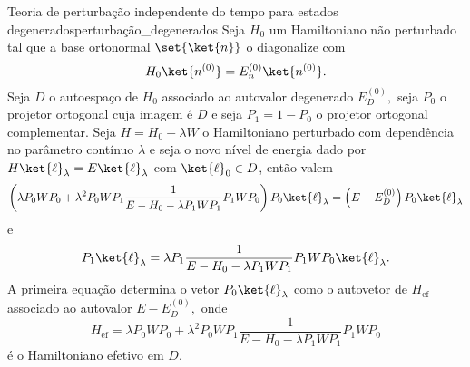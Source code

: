 \begin{theorem}{Teoria de perturbação independente do tempo para estados degenerados}{perturbação_degenerados}
    Seja \(H_0\) um Hamiltoniano não perturbado tal que a base ortonormal \(\set{\ket{n}}\) o diagonalize com 
    \begin{equation*}
        H_0 \ket{n^{(0)}} = E_{n}^{(0)} \ket{n^{(0)}}.
    \end{equation*}
    Seja \(D\) o autoespaço de \(H_0\) associado ao autovalor degenerado \(E_D^{(0)},\) seja \(P_0\) o projetor ortogonal cuja imagem é \(D\) e seja \(P_1 = 1 - P_0\) o projetor ortogonal complementar. Seja \(H = H_0 + \lambda W\) o Hamiltoniano perturbado com dependência no parâmetro contínuo \(\lambda\) e seja o novo nível de energia dado por \(H\ket{\ell}_\lambda = E \ket{\ell}_\lambda\) com \(\ket{\ell}_0 \in D\), então valem
    \begin{equation*}
        \left(\lambda P_0 W P_0 + \lambda^2 P_0 W P_1 \frac{1}{E - H_0 - \lambda P_1WP_1} P_1 W P_0\right) P_0\ket{\ell}_\lambda = \left(E - E_D^{(0)}\right) P_0\ket{\ell}_\lambda
    \end{equation*}
    e
    \begin{equation*}
        P_1 \ket{\ell}_\lambda = \lambda P_1 \frac{1}{E - H_0 - \lambda P_1 W P_1} P_1 W P_0 \ket{\ell}_\lambda.
    \end{equation*}
    A primeira equação determina o vetor \(P_0\ket{\ell}_\lambda\) como o autovetor de \(H_\mathrm{ef}\) associado ao autovalor \(E - E_D^{(0)},\) onde
    \begin{equation*}
        H_\mathrm{ef} = \lambda P_0 W P_0 + \lambda^2 P_0 W P_1 \frac{1}{E - H_0 - \lambda P_1WP_1} P_1 W P_0
    \end{equation*}
    é o Hamiltoniano efetivo em \(D\).
\end{theorem}

